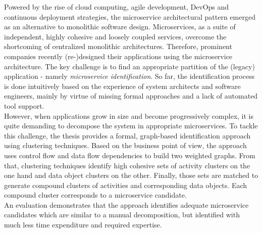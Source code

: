 

\Abstract
Powered by the rise of cloud computing, agile development, DevOps and continuous deployment strategies, the microservice architectural pattern emerged as an alternative to monolithic software design. Microservices, as a suite of independent, highly cohesive and loosely coupled services, overcome the shortcoming of centralized monolithic architectures. Therefore, prominent companies recently (re-)designed their applications using the microservice architecture.
The key challenge is to find an appropriate partition of the (legacy) application - namely \textit{microservice identification}. 
So far, the identification process is done intuitively based on the experience of system architects and software engineers, mainly by virtue of missing formal approaches and a lack of automated tool support. \\
However, when applications grow in size and become progressively complex, it is quite demanding to decompose the system in appropriate microservices.
To tackle this challenge, the thesis provides a formal, graph-based identification approach using clustering techniques. Based on the business point of view, the approach uses control flow and data flow dependencies to build two weighted graphs. From that, clustering techniques identify high cohesive sets of activity clusters on the one hand and data object clusters on the other.
Finally, those sets are matched to generate compound clusters of activities and corresponding data objects. Each compound cluster corresponds to a microservice candidate. \\
An evaluation demonstrates that the approach identifies adequate microservice candidates which are similar to a manual decomposition, but identified with much less time expenditure and required expertise.


